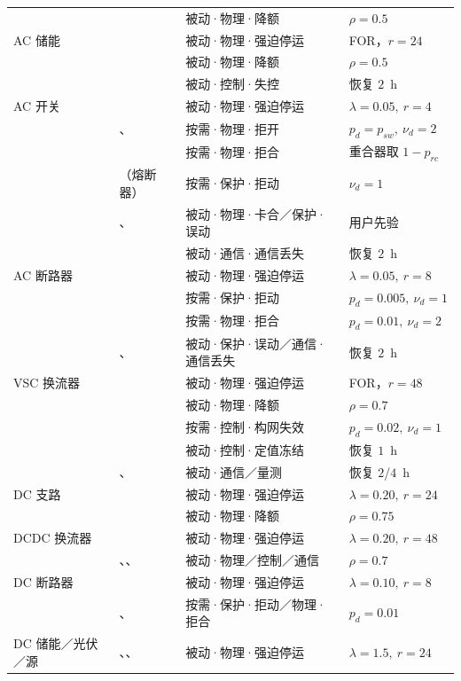 \begin{center}
\begin{longtable}{@{}L{2.2cm}L{3.9cm}L{4.5cm}L{3.4cm}@{}}
 &  & 被动·物理·降额 & $\rho{=}0.5$\\
AC 储能 &  & 被动·物理·强迫停运 & FOR，$r{=}24$\\
 &  & 被动·物理·降额 & $\rho{=}0.5$\\
 &  & 被动·控制·失控 & 恢复 $2$~h\\
\midrule
AC 开关 &  & 被动·物理·强迫停运 & $\lambda{=}0.05,\ r{=}4$\\
 & 、 & 按需·物理·拒开 & $p_d{=}p_{sw},\ \nu_d{=}2$\\
 &  & 按需·物理·拒合 & 重合器取 $1{-}p_{rc}$\\
 & （熔断器）& 按需·保护·拒动 & $\nu_d{=}1$\\
 & 、 & 被动·物理·卡合／保护·误动 & 用户先验\\
 &  & 被动·通信·通信丢失 & 恢复 $2$~h\\
AC 断路器 &  & 被动·物理·强迫停运 & $\lambda{=}0.05,\ r{=}8$\\
 &  & 按需·保护·拒动 & $p_d{=}0.005,\ \nu_d{=}1$\\
 &  & 按需·物理·拒合 & $p_d{=}0.01,\ \nu_d{=}2$\\
 & 、 & 被动·保护·误动／通信·通信丢失 & 恢复 $2$~h\\
\midrule
VSC 换流器 &  & 被动·物理·强迫停运 & FOR，$r{=}48$\\
 &  & 被动·物理·降额 & $\rho{=}0.7$\\
 &  & 按需·控制·构网失效 & $p_d{=}0.02,\ \nu_d{=}1$\\
 &  & 被动·控制·定值冻结 & 恢复 $1$~h\\
 & 、 & 被动·通信／量测 & 恢复 $2$/$4$~h\\
DC 支路 &  & 被动·物理·强迫停运 & $\lambda{=}0.20,\ r{=}24$\\
 &  & 被动·物理·降额 & $\rho{=}0.75$\\
DCDC 换流器 &  & 被动·物理·强迫停运 & $\lambda{=}0.20,\ r{=}48$\\
 & 、、 & 被动·物理／控制／通信 & $\rho{=}0.7$\\
DC 断路器 &  & 被动·物理·强迫停运 & $\lambda{=}0.10,\ r{=}8$\\
 & 、 & 按需·保护·拒动／物理·拒合 & $p_d{=}0.01$\\
DC 储能／光伏／源 & 、、 & 被动·物理·强迫停运 & $\lambda{=}1.5,\ r{=}24$\\
\end{longtable}
\end{center}
